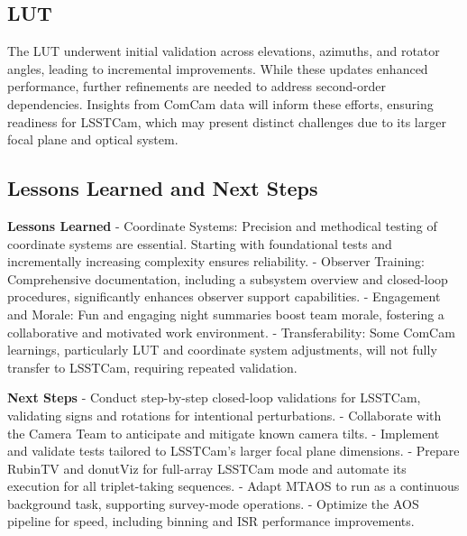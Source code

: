 \subsection{LUT}
The LUT underwent initial validation across elevations, azimuths, and rotator angles, 
leading to incremental improvements. While these updates enhanced performance, 
further refinements are needed to address second-order dependencies. Insights 
from ComCam data will inform these efforts, ensuring readiness for LSSTCam, which 
may present distinct challenges due to its larger focal plane and optical system.

\subsection{Lessons Learned and Next Steps}
\textbf{Lessons Learned}
- Coordinate Systems: Precision and methodical testing of coordinate systems are essential. 
Starting with foundational tests and incrementally increasing complexity ensures reliability.
- Observer Training: Comprehensive documentation, including a subsystem overview and closed-loop procedures, 
significantly enhances observer support capabilities.
- Engagement and Morale: Fun and engaging night summaries boost team morale, fostering a collaborative 
and motivated work environment.
- Transferability: Some ComCam learnings, particularly LUT and coordinate system adjustments, 
will not fully transfer to LSSTCam, requiring repeated validation.

\textbf{Next Steps}
- Conduct step-by-step closed-loop validations for LSSTCam, validating signs and rotations for intentional perturbations.
- Collaborate with the Camera Team to anticipate and mitigate known camera tilts.
- Implement and validate tests tailored to LSSTCam's larger focal plane dimensions.
- Prepare RubinTV and donutViz for full-array LSSTCam mode and automate its execution for all triplet-taking sequences.
- Adapt MTAOS to run as a continuous background task, supporting survey-mode operations.
- Optimize the AOS pipeline for speed, including binning and ISR performance improvements.


